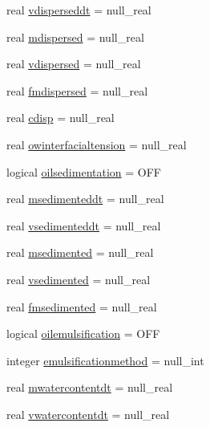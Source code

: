 \begin{DoxyCompactItemize}
\item 
real \mbox{\hyperlink{structmoduleoil_1_1t__var_a47bb0187e2a0a4725bdfbc617c26ee8f}{vdisperseddt}} = null\+\_\+real
\item 
real \mbox{\hyperlink{structmoduleoil_1_1t__var_afca7ae2bd3c66b07d56b3093b9127a48}{mdispersed}} = null\+\_\+real
\item 
real \mbox{\hyperlink{structmoduleoil_1_1t__var_acd6752ba645e17b195890bc84ac5dab7}{vdispersed}} = null\+\_\+real
\item 
real \mbox{\hyperlink{structmoduleoil_1_1t__var_a16809801c65a00cfd62f728920b28e32}{fmdispersed}} = null\+\_\+real
\item 
real \mbox{\hyperlink{structmoduleoil_1_1t__var_a89ae91159a13fa6cc38c77833b27ecbb}{cdisp}} = null\+\_\+real
\item 
real \mbox{\hyperlink{structmoduleoil_1_1t__var_a21349d4015a22b620ddacb63bac18e30}{owinterfacialtension}} = null\+\_\+real
\item 
logical \mbox{\hyperlink{structmoduleoil_1_1t__var_a9b8696650352056de2ff68dffc532e20}{oilsedimentation}} = O\+FF
\item 
real \mbox{\hyperlink{structmoduleoil_1_1t__var_a9d8332ff96cd37ba35b6a28924a28357}{msedimenteddt}} = null\+\_\+real
\item 
real \mbox{\hyperlink{structmoduleoil_1_1t__var_ac00c4d80b51365830ef155bda130470b}{vsedimenteddt}} = null\+\_\+real
\item 
real \mbox{\hyperlink{structmoduleoil_1_1t__var_a40386651ef39d847bcd4e7429e6a0968}{msedimented}} = null\+\_\+real
\item 
real \mbox{\hyperlink{structmoduleoil_1_1t__var_afc0aeb0f79e2a0b791aa69bc14671e3c}{vsedimented}} = null\+\_\+real
\item 
real \mbox{\hyperlink{structmoduleoil_1_1t__var_ad49302de3ab6374e56d1bf55fd69d1f9}{fmsedimented}} = null\+\_\+real
\item 
logical \mbox{\hyperlink{structmoduleoil_1_1t__var_a076d1ff3ba9c58326365c0e6278e91c9}{oilemulsification}} = O\+FF
\item 
integer \mbox{\hyperlink{structmoduleoil_1_1t__var_a63c66448b15431a9c292c7542745fb54}{emulsificationmethod}} = null\+\_\+int
\item 
real \mbox{\hyperlink{structmoduleoil_1_1t__var_a536b93336491597591c9b533264d3624}{mwatercontentdt}} = null\+\_\+real
\item 
real \mbox{\hyperlink{structmoduleoil_1_1t__var_a63ec2935678151556e24239d5048e163}{vwatercontentdt}} = null\+\_\+real

\end{DoxyCompactItemize}

